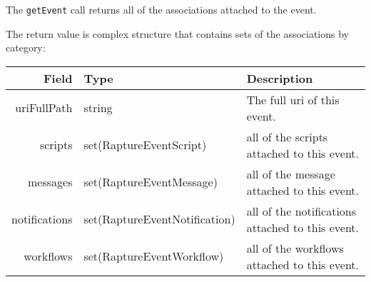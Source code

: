 The \verb+getEvent+ call returns all of the associations attached to the event.

The return value is complex structure that contains sets of the associations by category:

\begin{table}[h]
\begin{center}
\begin{tabular}{r l p{6cm}}
  Field & Type & Description \\
  \hline
  uriFullPath & string & The full uri of this event.\\
  scripts & set(RaptureEventScript) & all of the scripts attached to this event.\\
  messages & set(RaptureEventMessage) & all of the message attached to this event.\\
  notifications & set(RaptureEventNotification) & all of the notifications attached to this event.\\
  workflows & set(RaptureEventWorkflow) & all of the workflows attached to this event.\\  
\end{tabular}
\end{center}
\end{table}
